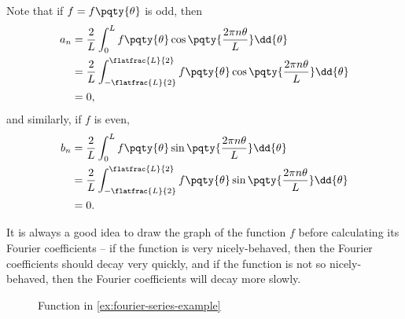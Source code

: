 Note that if \(f = f\pqty{\theta}\) is odd, then
\begin{subequations}
    \begin{align}
        a_n &= \frac{2}{L} \int_{0}^{L} f\pqty{\theta} \cos \pqty{\frac{2 \pi n \theta}{L}} \dd{\theta} \\
        &= \frac{2}{L} \int_{- \flatfrac{L}{2}}^{\flatfrac{L}{2}} f\pqty{\theta} \cos \pqty{\frac{2 \pi n \theta}{L}} \dd{\theta} \\
        &= 0,
    \end{align}
\end{subequations}
and similarly, if \(f\) is even,
\begin{subequations}
    \begin{align}
        b_n &= \frac{2}{L} \int_{0}^{L} f\pqty{\theta} \sin \pqty{\frac{2 \pi n \theta}{L}} \dd{\theta} \\
        &= \frac{2}{L} \int_{- \flatfrac{L}{2}}^{\flatfrac{L}{2}} f\pqty{\theta} \sin \pqty{\frac{2 \pi n \theta}{L}} \dd{\theta} \\
        &= 0.
    \end{align}
\end{subequations}

It is always a good idea to draw the graph of the function \(f\) before calculating its Fourier coefficients -- if the function is very nicely-behaved, then the Fourier coefficients should decay very quickly, and if the function is not so nicely-behaved, then the Fourier coefficients will decay more slowly.

\begin{figure}[ht!]
    \centering
    \caption{Function in \autoref{ex:fourier-series-example}}
    \label{fig:fourier-series-example}%
\end{figure}


